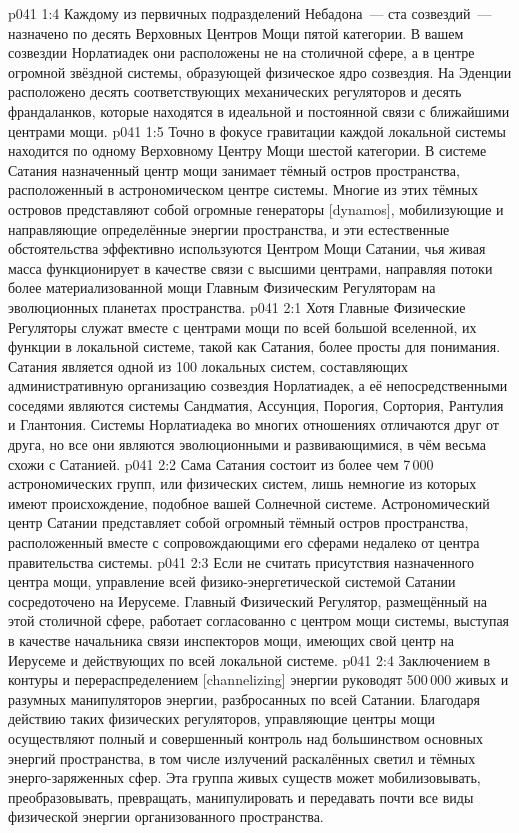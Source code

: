 \vs p041 1:4 Каждому из первичных подразделений Небадона~--- ста созвездий~--- назначено по десять Верховных Центров Мощи пятой категории. В вашем созвездии Норлатиадек они расположены не на столичной сфере, а в центре огромной звёздной системы, образующей физическое ядро созвездия. На Эденции расположено десять соответствующих механических регуляторов и десять франдаланков, которые находятся в идеальной и постоянной связи с ближайшими центрами мощи.
\vs p041 1:5 Точно в фокусе гравитации каждой локальной системы находится по одному Верховному Центру Мощи шестой категории. В системе Сатания назначенный центр мощи занимает тёмный остров пространства, расположенный в астрономическом центре системы. Многие из этих тёмных островов представляют собой огромные генераторы [dynamos], мобилизующие и направляющие определённые энергии пространства, и эти естественные обстоятельства эффективно используются Центром Мощи Сатании, чья живая масса функционирует в качестве связи с высшими центрами, направляя потоки более материализованной мощи Главным Физическим Регуляторам на эволюционных планетах пространства.
\vs p041 2:1 Хотя Главные Физические Регуляторы служат вместе с центрами мощи по всей большой вселенной, их функции в локальной системе, такой как Сатания, более просты для понимания. Сатания является одной из 100 локальных систем, составляющих административную организацию созвездия Норлатиадек, а её непосредственными соседями являются системы Сандматия, Ассунция, Порогия, Сортория, Рантулия и Глантония. Системы Норлатиадека во многих отношениях отличаются друг от друга, но все они являются эволюционными и развивающимися, в чём весьма схожи с Сатанией.
\vs p041 2:2 Сама Сатания состоит из более чем 7\,000 астрономических групп, или физических систем, лишь немногие из которых имеют происхождение, подобное вашей Солнечной системе. Астрономический центр Сатании представляет собой огромный тёмный остров пространства, расположенный вместе с сопровождающими его сферами недалеко от центра правительства системы.
\vs p041 2:3 \pc Если не считать присутствия назначенного центра мощи, управление всей физико\hyp{}энергетической системой Сатании сосредоточено на Иерусеме. Главный Физический Регулятор, размещённый на этой столичной сфере, работает согласованно с центром мощи системы, выступая в качестве начальника связи инспекторов мощи, имеющих свой центр на Иерусеме и действующих по всей локальной системе.
\vs p041 2:4 Заключением в контуры и перераспределением [channelizing] энергии руководят 500\,000 живых и разумных манипуляторов энергии, разбросанных по всей Сатании. Благодаря действию таких физических регуляторов, управляющие центры мощи осуществляют полный и совершенный контроль над большинством основных энергий пространства, в том числе излучений раскалённых светил и тёмных энерго\hyp{}заряженных сфер. Эта группа живых существ может мобилизовывать, преобразовывать, превращать, манипулировать и передавать почти все виды физической энергии организованного пространства.

